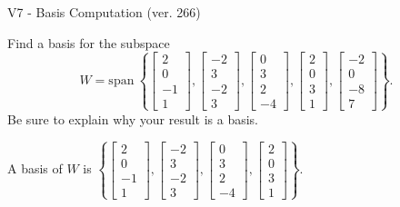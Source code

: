 \begin{exercise}
  \begin{exerciseTitle}V7 - Basis Computation (ver. 266)\end{exerciseTitle}
  \begin{exerciseStatement}
    Find a basis for the subspace 
\[W=\mathrm{span}\ \left\{\left[\begin{array}{r}
2 \\
0 \\
-1 \\
1
\end{array}\right] , \left[\begin{array}{r}
-2 \\
3 \\
-2 \\
3
\end{array}\right] , \left[\begin{array}{r}
0 \\
3 \\
2 \\
-4
\end{array}\right] , \left[\begin{array}{r}
2 \\
0 \\
3 \\
1
\end{array}\right] , \left[\begin{array}{r}
-2 \\
0 \\
-8 \\
7
\end{array}\right]\right\}.\]
 Be sure to explain why your result is a basis.


  \end{exerciseStatement}
  \begin{exerciseAnswer}
   A basis of \(W\) is  \(\left\{\left[\begin{array}{r}
2 \\
0 \\
-1 \\
1
\end{array}\right] , \left[\begin{array}{r}
-2 \\
3 \\
-2 \\
3
\end{array}\right] , \left[\begin{array}{r}
0 \\
3 \\
2 \\
-4
\end{array}\right] , \left[\begin{array}{r}
2 \\
0 \\
3 \\
1
\end{array}\right]\right\}\).
  


  \end{exerciseAnswer}
\end{exercise}